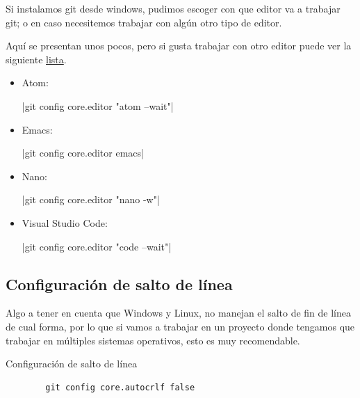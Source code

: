 Si instalamos git desde windows, pudimos escoger con que editor va a trabajar git; o en caso necesitemos trabajar con algún otro tipo de editor.

Aquí se presentan unos pocos, pero si gusta trabajar con otro editor puede ver la siguiente
\href{https://git-scm.com/book/en/v2/Appendix-C\%3A-Git-Commands-Setup-and-Config}{lista}.

\begin{itemize}

	\item Atom:
	\begin{terminal}
		|git config core.editor "atom --wait"|
	\end{terminal}

	\item Emacs:
	\begin{terminal}
		|git config core.editor emacs|
	\end{terminal}

	\item Nano:
	\begin{terminal}
		|git config core.editor "nano -w"|
	\end{terminal}
	
	\item Visual Studio Code:
	\begin{terminal}
		|git config core.editor "code --wait"|
	\end{terminal}	

\end{itemize}

\subsection{Configuración de salto de línea}

Algo a tener en cuenta que Windows y Linux, no manejan el salto de fin de línea de cual forma, por lo que si vamos a trabajar en un proyecto donde tengamos que
trabajar en múltiples sistemas operativos, esto es muy recomendable.

\begin{gitCode}{Configuración de salto de línea}
	\begin{verbatim}
		git config core.autocrlf false
	\end{verbatim}
\end{gitCode}